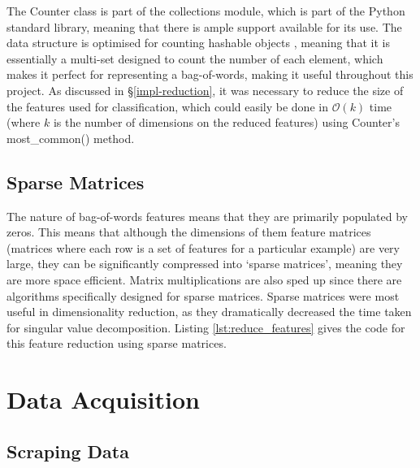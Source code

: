 \documentclass[12pt,a4paper,twoside,openright]{report}
\begin{document}
The Counter class is part of the collections module, which is part of the Python standard library, meaning that there is ample support available for its use. The data structure is optimised for counting hashable objects \cite{pythoncollectionsdocs}, meaning that it is essentially a multi-set designed to count the number of each element, which makes it perfect for representing a bag-of-words, making it useful throughout this project. As discussed in \S\ref{impl-reduction}, it was necessary to reduce the size of the features used for classification, which could easily be done in $\mathcal{O}(k)$ time (where $k$ is the number of dimensions on the reduced features) using Counter's most\_common() method.

\subsection{Sparse Matrices}

The nature of bag-of-words features means that they are primarily populated by zeros. This means that although the dimensions of them feature matrices (matrices where each row is a set of features for a particular example) are very large, they can be significantly compressed into `sparse matrices', meaning they are more space efficient. Matrix multiplications are also sped up since there are algorithms specifically designed for sparse matrices. Sparse matrices were most useful in dimensionality reduction, as they dramatically decreased the time taken for singular value decomposition. Listing \ref{lst:reduce_features} gives the code for this feature reduction using sparse matrices.

\section{Data Acquisition} \label{impl-acquisition}
\subsection{Scraping Data} \label{impl-scraping}
\end{document}
